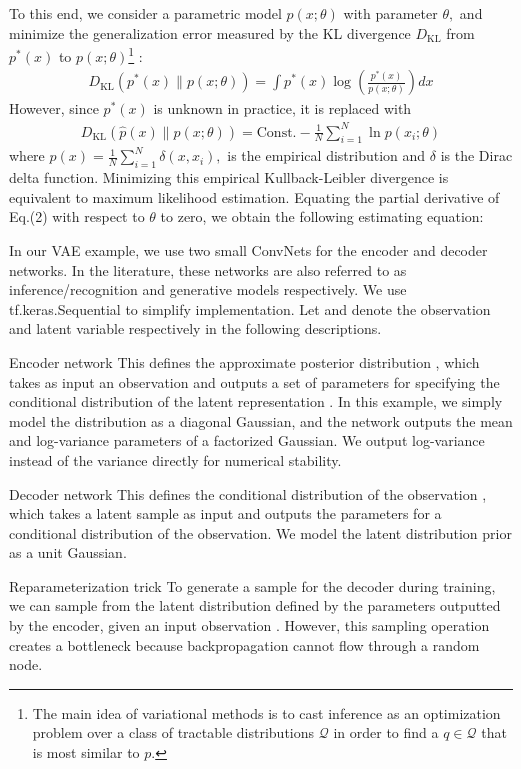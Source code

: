 To this end, we consider a parametric model $p(x ; \theta)$ with parameter $\theta,$ and minimize the generalization error measured by the KL divergence $D_{\mathrm{KL}}$ from $p^{*}(x)$ to $p(x ; \theta)$\footnote{The main idea of variational methods is to cast inference as an optimization problem over a class of tractable distributions $\mathcal{Q}$ in order to find a $q \in \mathcal{Q}$ that is most similar to $p$.} :
\begin{align}
D_{\mathrm{KL}}\left(p^{*}(x) \| p(x ; \theta)\right)=\int p^{*}(x) \log \left(\frac{p^{*}(x)}{p(x ; \theta)}\right) d x
\end{align}
However, since $p^{*}(x)$ is unknown in practice, it is replaced with
\begin{align}
D_{\mathrm{KL}}(\hat{p}(x) \| p(x ; \theta))=\mathrm{Const.}-\frac{1}{N} \sum_{i=1}^{N} \ln p\left(x_{i} ; \theta\right)
\end{align}
where $\hat{p}(x)=\frac{1}{N} \sum_{i=1}^{N} \delta\left(x, x_{i}\right),$ is the empirical distribution and $\delta$ is the Dirac delta function. Minimizing this empirical Kullback-Leibler divergence is equivalent to maximum likelihood estimation. Equating the partial derivative of Eq.(2) with respect to $\theta$ to zero, we obtain the following estimating equation:

In our VAE example, we use two small ConvNets for the encoder and decoder networks. In the literature, these networks are also referred to as inference/recognition and generative models respectively. We use tf.keras.Sequential to simplify implementation. Let  and  denote the observation and latent variable respectively in the following descriptions.

Encoder network
This defines the approximate posterior distribution , which takes as input an observation and outputs a set of parameters for specifying the conditional distribution of the latent representation . In this example, we simply model the distribution as a diagonal Gaussian, and the network outputs the mean and log-variance parameters of a factorized Gaussian. We output log-variance instead of the variance directly for numerical stability.

Decoder network
This defines the conditional distribution of the observation , which takes a latent sample  as input and outputs the parameters for a conditional distribution of the observation. We model the latent distribution prior  as a unit Gaussian.

Reparameterization trick
To generate a sample  for the decoder during training, we can sample from the latent distribution defined by the parameters outputted by the encoder, given an input observation . However, this sampling operation creates a bottleneck because backpropagation cannot flow through a random node.

